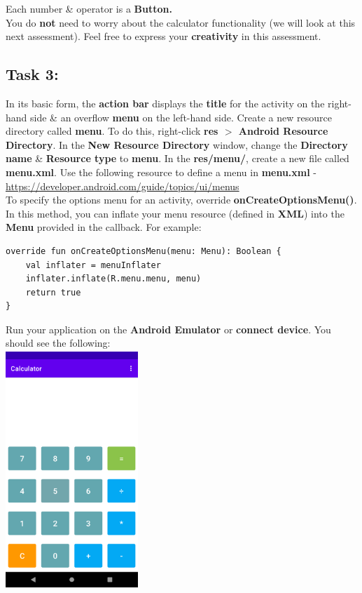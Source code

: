 \documentclass{article}
\begin{document}
Each number \& operator is a \textbf{Button.} \\

You do \textbf{not} need to worry about the calculator functionality (we will look at this next assessment). Feel free to express your \textbf{creativity} in this assessment.

\subsection*{Task 3:} In its basic form, the \textbf{action bar} displays the \textbf{title} for the activity on the right-hand side \& an overflow \textbf{menu} on the left-hand side. Create a new resource directory called \textbf{menu}. To do this, right-click \textbf{res $>$ Android Resource Directory}. In the \textbf{New Resource Directory} window, change the \textbf{Directory name} \& \textbf{Resource type} to \textbf{menu}. In the \textbf{res/menu/}, create a new file called \textbf{menu.xml}. Use the following resource to define a menu in \textbf{menu.xml} - \href{https://developer.android.com/guide/topics/ui/menus}{https://developer.android.com/guide/topics/ui/menus} \\ 

To specify the options menu for an activity, override \textbf{onCreateOptionsMenu()}. In this method, you can inflate your menu resource (defined in \textbf{XML}) into the \textbf{Menu} provided in the callback. For example:

\begin{verbatim}
override fun onCreateOptionsMenu(menu: Menu): Boolean {
    val inflater = menuInflater
    inflater.inflate(R.menu.menu, menu)
    return true
}
\end{verbatim}

Run your application on the \textbf{Android Emulator} or \textbf{connect device}. You should see the following: \\

\includegraphics[width=5cm, height=9cm]{../tex/img/02-android-overview/practical/calculator-2.png} 
\end{document}
